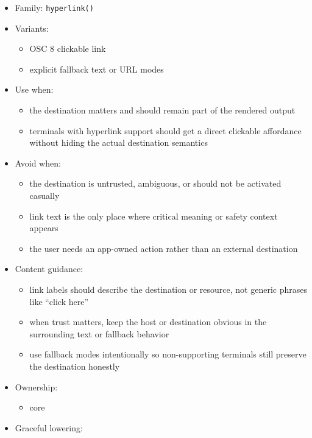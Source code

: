 \begin{itemize}
\tightlist
\item
  Family: \texttt{h\allowbreak{}y\allowbreak{}p\allowbreak{}e\allowbreak{}r\allowbreak{}l\allowbreak{}i\allowbreak{}n\allowbreak{}k\allowbreak{}(\allowbreak{})}
\item
  Variants:

  \begin{itemize}
  \tightlist
  \item
    OSC 8 clickable link
  \item
    explicit fallback text or URL modes
  \end{itemize}
\item
  Use when:

  \begin{itemize}
  \tightlist
  \item
    the destination matters and should remain part of the rendered output
  \item
    terminals with hyperlink support should get a direct clickable affordance without hiding the actual destination semantics
  \end{itemize}
\item
  Avoid when:

  \begin{itemize}
  \tightlist
  \item
    the destination is untrusted, ambiguous, or should not be activated casually
  \item
    link text is the only place where critical meaning or safety context appears
  \item
    the user needs an app-owned action rather than an external destination
  \end{itemize}
\item
  Content guidance:

  \begin{itemize}
  \tightlist
  \item
    link labels should describe the destination or resource, not generic phrases like ``click here''
  \item
    when trust matters, keep the host or destination obvious in the surrounding text or fallback behavior
  \item
    use fallback modes intentionally so non-supporting terminals still preserve the destination honestly
  \end{itemize}
\item
  Ownership:

  \begin{itemize}
  \tightlist
  \item
    core
  \end{itemize}
\item
  Graceful lowering:


\end{itemize}
